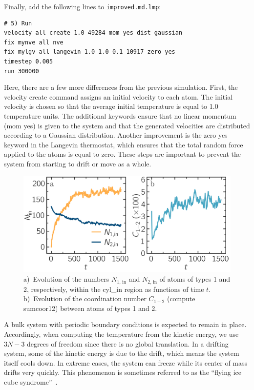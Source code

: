 \documentclass[9pt,tutorial]{livecoms}
\newcommand{\lmpcmd}[1]{\hspace{0pt}\colorbox{listing}{\textcolor{command}{\small{#1}}}\hspace{0pt}} %
\newcommand{\flecmd}[1]{\textcolor{command}{\texttt{#1}}} %
\begin{document}
Finally, add the following lines to \flecmd{improved.md.lmp}:
\begin{lstlisting}
# 5) Run
velocity all create 1.0 49284 mom yes dist gaussian
fix mynve all nve
fix mylgv all langevin 1.0 1.0 0.1 10917 zero yes
timestep 0.005
run 300000
\end{lstlisting}
Here, there are a few more differences from the previous simulation.
First, the \lmpcmd{velocity create} command assigns an initial velocity
to each atom.  The initial velocity is chosen so that the average
initial temperature is equal to 1.0 temperature units.  The additional
keywords ensure that no linear momentum (\lmpcmd{mom yes}) is given to
the system and that the generated velocities are distributed according
to a Gaussian distribution.  Another improvement is the \lmpcmd{zero
  yes} keyword in the Langevin thermostat, which ensures that the total
random force applied to the atoms is equal to zero. These steps are
important to prevent the system from starting to drift or move as a
whole.
\begin{figure}
\centering
\includegraphics[width=\linewidth]{LJ-mixing}
\caption{a)~Evolution of the numbers $N_\text{1, in}$ and $N_\text{2, in}$ of atoms
of types 1 and 2, respectively, within the \lmpcmd{cyl\_in} region as functions
of time $t$.  b)~Evolution of the coordination number $C_{1-2}$ (compute \lmpcmd{sumcoor12})
between atoms of types 1 and 2.}
\label{fig:mixing}
\end{figure}

\begin{note}
  A bulk system with periodic boundary conditions is expected to remain
  in place.  Accordingly, when computing the temperature from the
  kinetic energy, we use $3N-3$ degrees of freedom since there is no
  global translation.  In a drifting system, some of the kinetic energy
  is due to the drift, which means the system itself cools down.  In
  extreme cases, the system can freeze while its center of mass drifts
  very quickly.  This phenomenon is sometimes referred to as the
  ``flying ice cube syndrome''~\cite{wong2016good}.
\end{note}
\end{document}
